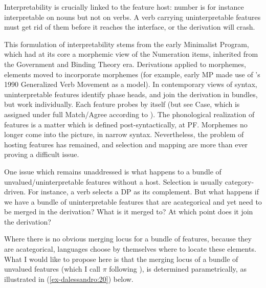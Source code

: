\documentclass[output=paper
,modfonts
,nonflat]{langsci/langscibook}
\begin{document}
Interpretability is crucially linked to the feature host: number is for instance interpretable on nouns but not on verbs. A verb carrying uninterpretable features must get rid of them before it reaches the interface, or the derivation will crash.

This formulation of interpretability stems from the early Minimalist Program, which had at its core a morphemic view of the Numeration items, inherited from the Government and Binding Theory era. Derivations applied to morphemes, elements moved to incorporate morphemes (for example, early MP made use of \citeauthor{Belletti1990}'s 1990 Generalized Verb Movement as a model). In contemporary views of syntax, uninterpretable features identify phase heads, and join the derivation in bundles, but work individually. Each feature probes by itself (but see Case, which is assigned under full Match/Agree according to \citealt{Chomsky2000}). The phonological realization of features is a matter which is defined post-syntactically, at PF. Morphemes no longer come into the picture, in narrow syntax. Nevertheless, the problem of hosting features has remained, and selection and mapping are more than ever proving a difficult issue.

One issue which remains unaddressed is what happens to a bundle of unvalued/uninterpretable features without a host. Selection is usually category-driven. For instance, a verb selects a DP as its complement. But what happens if we have a bundle of uninterpretable features that are acategorical and yet need to be merged in the derivation? What is it merged to? At which point does it join the derivation?

Where there is no obvious merging locus for a bundle of features, because they are acategorical, languages choose by themselves where to locate these elements. What I would like to propose here is that the merging locus of a bundle of unvalued features (which I call $\pi $ following \citealt{D`Alessandro2017}), is determined parametrically, as illustrated in (\ref{ex-dalessandro:20}) below.
\end{document}
